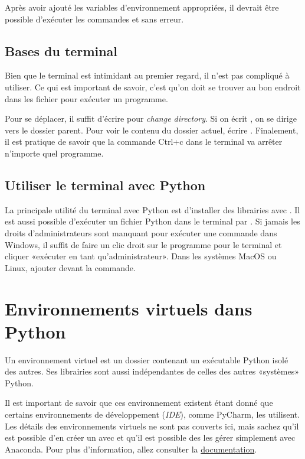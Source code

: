 \documentclass{article}
\begin{document}
Après avoir ajouté les variables d'environnement appropriées, il devrait être possible d'exécuter les commandes  et  sans erreur.

\subsection{Bases du terminal}
Bien que le terminal est intimidant au premier regard, il n'est pas compliqué à utiliser. Ce qui est important de savoir, c'est qu'on doit se trouver au bon endroit dans les fichier pour exécuter un programme. 

Pour se déplacer, il suffit d'écrire  pour \textit{change directory}. Si on écrit , on se dirige vers le dossier parent. Pour voir le contenu du dossier actuel, écrire . Finalement, il est pratique de savoir que la commande Ctrl+c dans le terminal va arrêter n'importe quel programme.

\subsection{Utiliser le terminal avec Python}
La principale utilité du terminal avec Python est d'installer des librairies avec . Il est aussi possible d'exécuter un fichier Python dans le terminal par . Si jamais les droits d'administrateurs sont manquant pour exécuter une commande dans Windows, il suffit de faire un clic droit sur le programme pour le terminal et cliquer «exécuter en tant qu'administrateur». Dans les systèmes MacOS ou Linux, ajouter  devant la commande.

\section{Environnements virtuels dans Python}
Un environnement virtuel est un dossier contenant un exécutable Python isolé des autres. Ses librairies sont aussi indépendantes de celles des autres «systèmes» Python. 

Il est important de savoir que ces environnement existent étant donné que certains  environnements de développement (\textit{IDE}), comme PyCharm, les utilisent.  Les détails des environnements virtuels ne sont pas couverts ici, mais sachez qu'il est possible d'en créer un avec  et qu'il est possible des les gérer simplement avec Anaconda. Pour plus d'information, allez consulter la \href{https://docs.conda.io/projects/conda/en/latest/user-guide/tasks/manage-environments.html}{documentation}.
\end{document}

